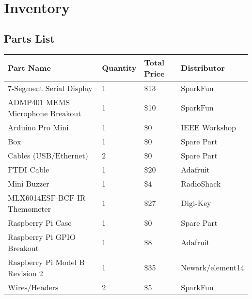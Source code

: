 \chapter{Inventory}

\section{Parts List}
\begin{tabular}{| l | l | l | l |}
  \hline
  \textbf{Part Name} & \textbf{Quantity} & \textbf{Total Price} &
  \textbf{Distributor} \\ \hline
  7-Segment Serial Display & 1 & \$13 & SparkFun \\ \hline
  ADMP401 MEMS Microphone Breakout & 1 & \$10 & SparkFun \\ \hline
  Arduino Pro Mini & 1 & \$0 & IEEE Workshop \\ \hline
  Box & 1 & \$0 & Spare Part \\ \hline
  Cables (USB/Ethernet) & 2 & \$0 & Spare Part \\ \hline
  FTDI Cable & 1 & \$20 & Adafruit \\ \hline
  Mini Buzzer & 1 & \$4 & RadioShack \\ \hline
  MLX6014ESF-BCF IR Themometer & 1 & \$27 & Digi-Key \\ \hline
  Raspberry Pi Case & 1 & \$0 & Spare Part \\ \hline
  Raspberry Pi GPIO Breakout & 1 & \$8 & Adafruit \\ \hline
  Raspberry Pi Model B Revision 2 & 1 & \$35 & Newark/element14
  \\ \hline
  Wires/Headers & 2 & \$5 & SparkFun \\ \hline
\end{tabular}

